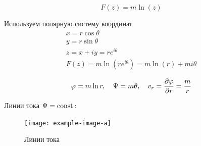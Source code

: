 \begin{equation}
	F(z)=m\ln(z)
\end{equation}

Используем полярную систему координат
\begin{gather}
	\label{eqss}
	x=r\cos\theta\\
	y=r\sin\theta\\
	z=x+iy=re^{i\theta}\\
	F(z)=m\ln(re^{i\theta})=m\ln(r)+mi\theta
\end{gather}

\begin{equation}
	\varphi=m\ln{r}, \quad \Psi=m\theta, \quad v_r=\pdv{\varphi}{r}=\frac{m}{r}
\end{equation}

Линии тока $\Psi=\mathrm{const}\,$:
\begin{figure}[h!]
    \centering
    \texttt{[image: example-image-a]}
    \caption{Линии тока}
    \label{fig:figure1}
\end{figure}

